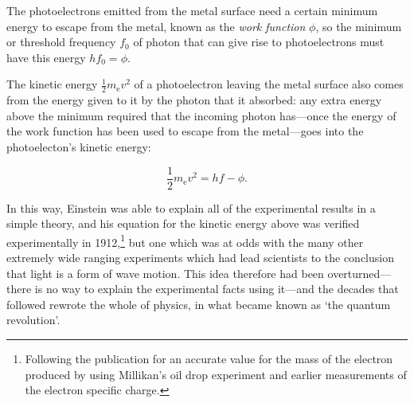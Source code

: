 The photoelectrons emitted from the metal surface need a certain minimum energy to escape from the metal, known as the \emph{work function} $\phi$, so the minimum or threshold frequency $f_{0}$ of photon that can give rise to photoelectrons must have this energy $hf_{0}=\phi$.

The kinetic energy $\frac{1}{2}m_{\mathrm{e}}v^2$ of a photoelectron leaving the metal surface also comes from the energy given to it by the photon that it absorbed: any extra energy above the minimum required that the incoming photon has---once the energy of the work function has been used to escape from the metal---goes into the photoelecton's kinetic energy:

\[\frac{1}{2}m_{\mathrm{e}}v^2=hf-\phi.\]


In this way, Einstein was able to explain all of the experimental results in a simple theory, and his equation for the kinetic energy above was verified experimentally in 1912,\footnote{Following the publication for an accurate value for the mass of the electron produced by using Millikan's oil drop experiment and earlier measurements of the electron specific charge.} but one which was at odds with the many other extremely wide ranging experiments which had lead scientists to the conclusion that light is a form of wave motion.  This idea therefore had been overturned---there is no way to explain the experimental facts using it---and the decades that followed rewrote the whole of physics, in what became known as `the quantum revolution'.
